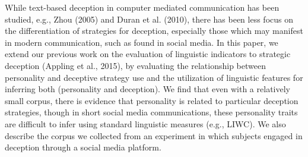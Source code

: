 While text-based deception in computer mediated communication has been studied, e.g., Zhou (2005) and Duran et al. (2010), there has been less focus on the differentiation of strategies for deception, especially those which may manifest in  modern communication, such as found in social media. In this paper, we extend our previous work on the evaluation of linguistic indicators to strategic deception (Appling et al., 2015), by evaluating the relationship between personality and deceptive strategy use and the utilization of linguistic features for inferring both (personality and deception). We find that even with a relatively small corpus, there is evidence that personality is related to particular deception strategies, though in short social media communications, these personality traits are difficult to infer using standard linguistic measures (e.g., LIWC). We also describe the corpus we collected from an experiment in which subjects engaged in deception through a social media platform.
